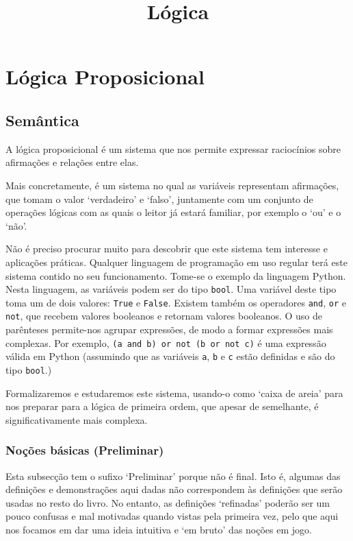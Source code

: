 \documentclass{report}
\title{Lógica}
\author{}
\date{}
\theoremstyle{definition}
\theoremstyle{remark}
\begin{document}
	\maketitle
	\newpage
	
	\tableofcontents
	\newpage
	
	\chapter{Lógica Proposicional}
	
	\section{Semântica}
	
	A lógica proposicional é um sistema que nos permite expressar raciocínios sobre afirmações e relações entre elas.
	
	Mais concretamente, é um sistema no qual as variáveis representam afirmações, que tomam o valor `verdadeiro' e `falso', juntamente com um conjunto de operações lógicas com as quais o leitor já estará familiar, por exemplo o `ou' e o `não'.
	
	Não é preciso procurar muito para descobrir que este sistema tem interesse e aplicações práticas. Qualquer linguagem de programação em uso regular terá este sistema contido no seu funcionamento. Tome-se o exemplo da linguagem Python. Nesta linguagem, as variáveis podem ser do tipo \texttt{bool}. Uma variável deste tipo toma um de dois valores: \texttt{True} e \texttt{False}. Existem também os operadores \texttt{and}, \texttt{or} e \texttt{not}, que recebem valores booleanos e retornam valores booleanos. O uso de parênteses permite-nos agrupar expressões, de modo a formar expressões mais complexas. Por exemplo, \texttt{(a and b) or not (b or not c)} é uma expressão válida em Python (assumindo que as variáveis \texttt{a}, \texttt{b} e \texttt{c} estão definidas e são do tipo \texttt{bool}.)
	
	Formalizaremos e estudaremos este sistema, usando-o como `caixa de areia' para nos preparar para a lógica de primeira ordem, que apesar de semelhante, é significativamente mais complexa.
	
	\subsection{Noções básicas (Preliminar)}
	
	Esta subsecção tem o sufixo `Preliminar' porque não é final. Isto é, algumas das definições e demonstrações aqui dadas não correspondem às definições que serão usadas no resto do livro. No entanto, as definições `refinadas' poderão ser um pouco confusas e mal motivadas quando vistas pela primeira vez, pelo que aqui nos focamos em dar uma ideia intuitiva e `em bruto' das noções em jogo.
	
\end{document}
